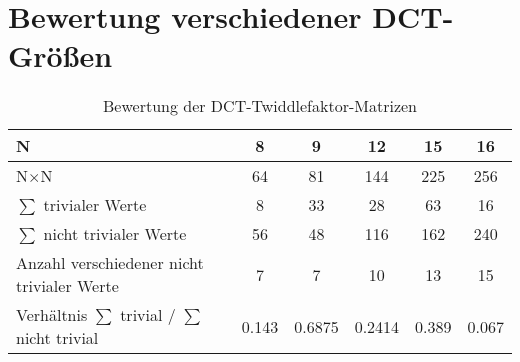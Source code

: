 \section{Bewertung verschiedener DCT-Größen}

\begingroup
  \renewcommand*{\arraystretch}{1.2} %
\begin{table}[ht]
 \centering
 \caption{Bewertung der DCT-Twiddlefaktor-Matrizen}
 \begin{tabular}{lccccc}
   \hline  
   N                                                 & 8     & 9      & 12     & 15    & 16\\
   \hline
   N$\times$N                                        & 64    & 81     & 144    & 225   & 256\\
   \rowcolor{lightgray}
   $\sum$ trivialer Werte                            & 8     & 33     & 28     & 63    & 16\\
   \rowcolor{lightgray}
   $\sum$ nicht trivialer Werte                      & 56    & 48     & 116    & 162   & 240\\
   Anzahl verschiedener nicht trivialer Werte        & 7     & 7      & 10     & 13    & 15\\
   Verhältnis $\sum$ trivial / $\sum$ nicht trivial  & 0.143 & 0.6875 & 0.2414 & 0.389 & 0.067\\
   \hline
 \end{tabular}
 \label{tab:DCT-TwiddlefaktorMatrizenBewertung}  
\end{table}
\endgroup
